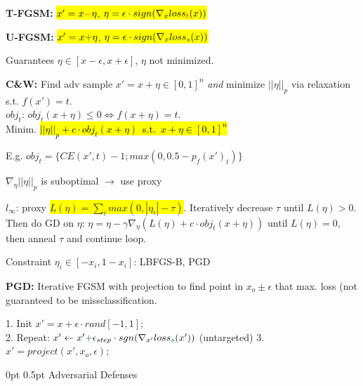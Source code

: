 \documentclass[11pt,landscape,a4paper,fleqn]{article}
\makeatletter
\renewcommand{\section}{\@startsection{section}{1}{0mm}%
                                {0pt}%
                                {0.5pt}%
                                {\color{myorange}\sffamily\small\bfseries}}
\newcommand{\mhl}[1]{\setlength{\fboxsep}{0pt}\colorbox{yellow}{#1}}
\makeatother
\begin{document}
\begin{multicols*}{4}
\textbf{T-FGSM:} \mhl{$x' = x \textcolor{red}{-} \eta$, $\eta =\epsilon \cdot sign(\nabla_x loss_{\textcolor{red}{t}} (x))$}

\textbf{U-FGSM:} \mhl{$x' = x \textcolor{darkgreen}{+} \eta$, $\eta = \epsilon \cdot sign(\nabla_x loss_{\textcolor{darkgreen}{s}} (x))$}

Guarantees $\eta \in [x-\epsilon, x+\epsilon]$, $\eta$ not minimized.


\textbf{C\&W:} Find adv sample $x' = x + \eta \in [0,1]^n$ \textit{and} minimize $||\eta||_p$ via relaxation s.t. $f(x') = t$.\\
$obj_t$: $obj_t(x+\eta) \leq 0 \Leftrightarrow f(x+\eta) = t$.\\
Minim. \mbox{\hl{$||\eta||_p + c \cdot obj_t(x+\eta)$ s.t. $x+\eta \in [0,1]^n$}}


E.g. {\fontsize{9.5}{6}\selectfont \mbox{$obj_t = \{ CE(x', t) - 1; max(0, 0.5 - p_f(x')_t)\}$}}

$\nabla_\eta ||\eta||_p$ is suboptimal $\rightarrow$ use proxy 

$l_\infty$: proxy \mhl{$L(\eta) = \sum_i max(0, |\eta_i| - \tau)$}. Iteratively decrease $\tau$ until $L(\eta)>0$. Then do GD on $\eta$: $\eta = \eta - \gamma \nabla_\eta(L(\eta) + c \cdot obj_t(x+\eta))$ until $L(\eta) = 0$, then anneal $\tau$ and continue loop.

Constraint $\eta_i \in [-x_i,1-x_i]$: LBFGS-B, PGD

\vspace*{1mm}


\textbf{PGD:} Iterative FGSM with projection to find point in $x_o \pm \epsilon$ that max. loss (not guaranteed to be missclassification.

1. Init $x' = x + \epsilon \cdot rand[-1,1]$;\\
2. Repeat: $x' \leftarrow x' \textcolor{darkgreen}{+} \epsilon_{step} \cdot sgn(\nabla_{x'} loss_{\textcolor{darkgreen}{s}} (x'))$ (untargeted)
3. $x' = project(x', x_o, \epsilon)$;
\vspace*{1mm}

\section{Adversarial Defenses}


\end{multicols*}
\end{document}
